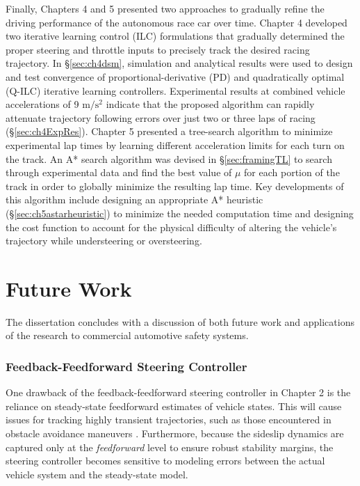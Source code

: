 Finally, Chapters 4 and 5 presented two approaches to gradually refine the driving performance of the autonomous race car 
over time. Chapter 4 developed two iterative learning control (ILC) formulations that gradually determined the proper steering 
and throttle inputs to precisely track the desired racing trajectory. In \S \ref{sec:ch4dsm}, simulation and analytical results were used to design and test convergence of 
 proportional-derivative (PD) and quadratically optimal (Q-ILC) iterative learning controllers. Experimental results at combined vehicle accelerations of 9 $\mathrm{m/s^2}$
 indicate that the proposed algorithm can rapidly attenuate trajectory following errors over just two or three laps of racing (\S \ref{sec:ch4ExpRes}).
 Chapter 5 presented a tree-search algorithm to minimize experimental lap times by learning different acceleration limits for each turn on the
track. An A* search algorithm was devised in \S \ref{sec:framingTL} to search through experimental data and find the best value of $\mu$ for each portion
 of the track in order to globally minimize the resulting lap time. Key developments of this algorithm include designing an appropriate A* heuristic 
 (\S \ref{sec:ch5astarheuristic}) to minimize the needed computation time and designing the cost function to account for the physical difficulty of altering the 
 vehicle's trajectory while understeering or oversteering. 


\section{Future Work}

The dissertation concludes with a discussion of both future work and applications of the research to commercial automotive safety
systems.

\subsubsection{Feedback-Feedforward Steering Controller}

One drawback of the feedback-feedforward steering controller in Chapter 2 is the reliance on steady-state feedforward estimates of 
vehicle states. This will cause issues for tracking highly transient trajectories, such as those encountered in obstacle
avoidance maneuvers \cite{joethesis}. Furthermore, because the sideslip dynamics are captured only at the \textit{feedforward} level
to ensure robust stability margins, the steering controller becomes sensitive to modeling errors
between the actual vehicle system and the steady-state model. 

